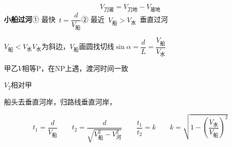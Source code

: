 
\[ V_{\text{刀玻}}=V_{\text{刀地}}-V_{\text{玻地}} \]
\textbf{小船过河}\quad ① 最快\ $t=\dfrac{d}{V_{\text{船}}}$\quad ② 最近\ $V_{\text{船}}>V_{\text{水}}$\ 垂直过河

$V_{\text{船}}<V_{\text{水}}$\quad $V_{\text{水}}$为斜边，$V_{\text{船}}$画圆找切线\quad $\sin\alpha=\dfrac{d}{L}=\dfrac{V_{\text{船}}}{V_{\text{水}}}$



甲乙$V$相等P，在NP上遇，渡河时间一致


$V_2$相对甲


船头去垂直河岸，归路线垂直河岸，

\[ t_1=\frac{d}{V_{\text{船}}}\qquad t_2=\frac{d}{\sqrt{V_{\text{船}}^{2}-V_{\text{河}}^{2}}}\qquad \frac{t_1}{t_2}=k\qquad k=\sqrt{1-\left(\frac{V_{\text{水}}}{V_{\text{船}}}\right)^{2}} \]
